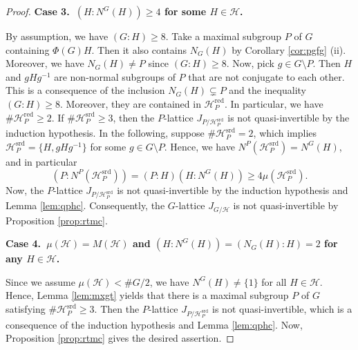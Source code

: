 \documentclass[12pt]{amsart}
\theoremstyle{plain}
\theoremstyle{definition}
\numberwithin{thm}{section}
\numberwithin{equation}{section}
\newcommand{\cH}{\mathcal{H}}
\DeclareMathOperator{\red}{red}
\DeclareMathOperator{\srd}{srd}
\begin{document}
\begin{proof}
\textbf{Case 3.~$(H:N^{G}(H))\geq 4$ for some $H\in \cH$. }

By assumption, we have $(G:H)\geq 8$. Take a maximal subgroup $P$ of $G$ containing $\Phi(G)H$. Then it also contains $N_{G}(H)$ by Corollary \ref{cor:pgfg} (ii). Moreover, we have $N_{G}(H)\neq P$ since $(G:H)\geq 8$. Now, pick $g\in G\setminus P$. Then $H$ and $gHg^{-1}$ are non-normal subgroups of $P$ that are not conjugate to each other. This is a consequence of the inclusion $N_{G}(H)\subsetneq P$ and the inequality $(G:H)\geq 8$. Moreover, they are contained in $\cH_{P}^{\red}$. In particular, we have $\#\cH_{P}^{\red}\geq 2$. If $\#\cH_{P}^{\srd}\geq 3$, then the $P$-lattice $J_{P/\cH_{P}^{\srd}}$ is not quasi-invertible by the induction hypothesis. In the following, suppose $\#\cH_{P}^{\srd}=2$, which implies $\cH_{P}^{\srd}=\{H,gHg^{-1}\}$ for some $g\in G\setminus P$. Hence, we have $N^{P}(\cH_{P}^{\srd})=N^{G}(H)$, and in particular
\begin{equation*}
    (P:N^{P}(\cH_{P}^{\srd}))=(P:H)(H:N^{G}(H))\geq 4\mu(\cH_{P}^{\srd}). 
\end{equation*}
Now, the $P$-lattice $J_{P/\cH_{P}^{\srd}}$ is not quasi-invertible by the induction hypothesis and Lemma \ref{lem:qphc}. Consequently, the $G$-lattice $J_{G/\cH}$ is not quasi-invertible by Proposition \ref{prop:rtmc}. 

\textbf{Case 4.~$\mu(\cH)=M(\cH)$ and $(H:N^{G}(H))=(N_{G}(H):H)=2$ for any $H\in \cH$. }

Since we assume $\mu(\cH)<\#G/2$, we have $N^{G}(H)\neq \{1\}$ for all $H\in \cH$. Hence, Lemma \ref{lem:mxgt} yields that there is a maximal subgroup $P$ of $G$ satisfying $\#\cH_{P}^{\srd}\geq 3$. Then the $P$-lattice $J_{P/\cH_{P}^{\srd}}$ is not quasi-invertible, which is a consequence of the induction hypothesis and Lemma \ref{lem:qphc}. Now, Proposition \ref{prop:rtmc} gives the desired assertion. 
\end{proof}
\end{document}
